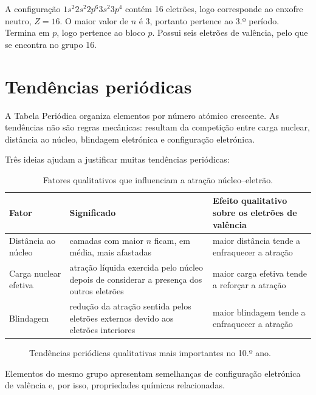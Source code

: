 \documentclass[11pt,a4paper,oneside]{book}
\begin{document}
\begin{exemplo}[title={Exemplo resolvido -- localizar um elemento na Tabela Periódica}]
A configuração $1s^2 2s^2 2p^6 3s^2 3p^4$ contém 16 eletrões, logo corresponde ao enxofre neutro, $Z=16$. O maior valor de $n$ é 3, portanto pertence ao 3.º período. Termina em $p$, logo pertence ao bloco $p$. Possui seis eletrões de valência, pelo que se encontra no grupo 16.
\end{exemplo}

\section{Tendências periódicas}
A Tabela Periódica organiza elementos por número atómico crescente. As tendências não são regras mecânicas: resultam da competição entre carga nuclear, distância ao núcleo, blindagem eletrónica e configuração eletrónica.

Três ideias ajudam a justificar muitas tendências periódicas:
\begin{table}[H]
\centering
\caption{Fatores qualitativos que influenciam a atração núcleo--eletrão.}
\begin{tabularx}{\textwidth}{lXX}
\toprule
Fator & Significado & Efeito qualitativo sobre os eletrões de valência \\
\midrule
Distância ao núcleo & camadas com maior $n$ ficam, em média, mais afastadas & maior distância tende a enfraquecer a atração \\
Carga nuclear efetiva & atração líquida exercida pelo núcleo depois de considerar a presença dos outros eletrões & maior carga efetiva tende a reforçar a atração \\
Blindagem & redução da atração sentida pelos eletrões externos devido aos eletrões interiores & maior blindagem tende a enfraquecer a atração \\
\bottomrule
\end{tabularx}
\end{table}

\begin{figure}[H]
\centering
{}
\caption{Tendências periódicas qualitativas mais importantes no 10.º ano.}
\end{figure} Elementos do mesmo grupo apresentam semelhanças de configuração eletrónica de valência e, por isso, propriedades químicas relacionadas.
\end{document}
